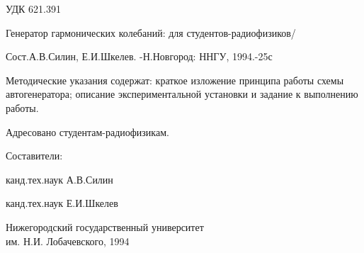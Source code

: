 \thispagestyle{empty}
УДК 621.391


Генератор гармонических колебаний: для студентов-радиофизиков/ 
\noindent

Сост.А.В.Силин, Е.И.Шкелев.
-Н.Новгород: ННГУ, 1994.-25с

\vfill
Методические указания содержат: краткое изложение принципа работы схемы автогенератора; описание экспериментальной установки и задание к выполнению работы.

Адресовано студентам-радиофизикам.
\vfill

\begin{center}
	Составители: 

	канд.тех.наук А.В.Силин
	
	канд.тех.наук Е.И.Шкелев
\end{center}
\vfill
\begin{flushleft}
Нижегородский государственный университет \\
им. Н.И. Лобачевского, 1994
\end{flushleft}
\newpage